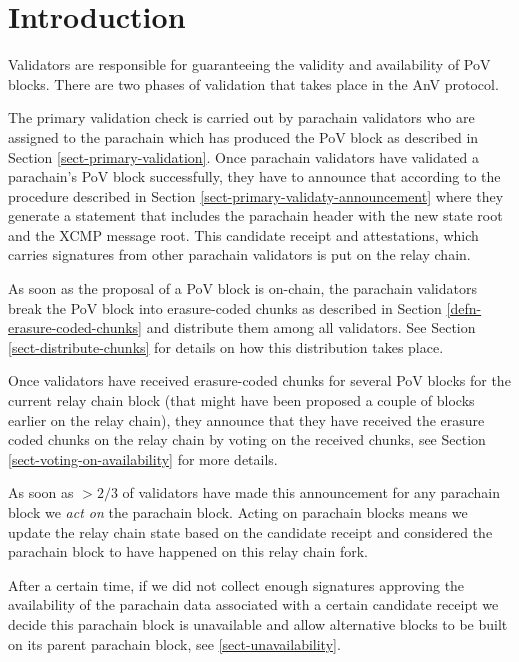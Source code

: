 \section{Introduction}

Validators are responsible for guaranteeing the validity and availability of PoV
blocks. There are two phases of validation that takes place in the AnV protocol.
\newline

The primary validation check is carried out by parachain validators who are
assigned to the parachain which has produced the PoV block as described in
Section \ref{sect-primary-validation}. Once parachain validators have validated
a parachain's PoV block successfully, they have to announce that according to
the procedure described in Section \ref{sect-primary-validaty-announcement}
where they generate a statement that includes the parachain header with the new
state root and the XCMP message root. This candidate receipt and attestations,
which carries signatures from other parachain validators is put on the relay
chain.
\newline

As soon as the proposal of a PoV block is on-chain, the parachain validators
break the PoV block into erasure-coded chunks as described in Section
\ref{defn-erasure-coded-chunks} and distribute them among all validators. See
Section \ref{sect-distribute-chunks} for details on how this distribution takes
place.
\newline

Once validators have received erasure-coded chunks for several PoV blocks for
the current relay chain block (that might have been proposed a couple of blocks
earlier on the relay chain), they announce that they have received the erasure
coded chunks on the relay chain by voting on the received chunks, see Section
\ref{sect-voting-on-availability} for more details.
\newline

As soon as $>2/3$ of validators have made this announcement for any parachain
block we \emph{act on} the parachain block. Acting on parachain blocks means we
update the relay chain state based on the candidate receipt and considered the
parachain block to have happened on this relay chain fork.
\newline

After a certain time, if we did not collect enough signatures approving the
availability of the parachain data associated with a certain candidate receipt
we decide this parachain block is unavailable and allow alternative blocks to be
built on its parent parachain block, see \ref{sect-unavailability}.
\newline

